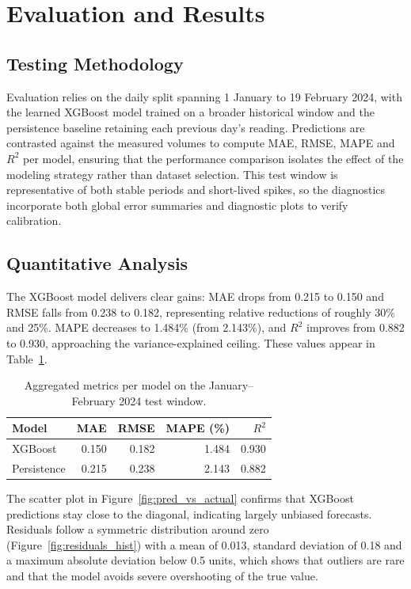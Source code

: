 \section{Evaluation and Results}
\subsection{Testing Methodology}
Evaluation relies on the daily split spanning 1 January to 19 February 2024, with the learned XGBoost model trained on a broader historical window and the persistence baseline retaining each previous day’s reading. Predictions are contrasted against the measured volumes to compute MAE, RMSE, MAPE and $R^2$ per model, ensuring that the performance comparison isolates the effect of the modeling strategy rather than dataset selection. This test window is representative of both stable periods and short-lived spikes, so the diagnostics incorporate both global error summaries and diagnostic plots to verify calibration.

\subsection{Quantitative Analysis}
The XGBoost model delivers clear gains: MAE drops from 0.215 to 0.150 and RMSE falls from 0.238 to 0.182, representing relative reductions of roughly 30\% and 25\%. MAPE decreases to 1.484\% (from 2.143\%), and $R^2$ improves from 0.882 to 0.930, approaching the variance-explained ceiling. These values appear in Table~\ref{tab:metrics}.

\begin{table}[ht]
\centering
\begin{tabular}{|l|r|r|r|r|}
\hline
\textbf{Model} & \textbf{MAE} & \textbf{RMSE} & \textbf{MAPE (\%)} & $R^{2}$ \\
\hline
XGBoost & 0.150 & 0.182 & 1.484 & 0.930 \\
\hline
Persistence & 0.215 & 0.238 & 2.143 & 0.882 \\
\hline
\end{tabular}
\caption{Aggregated metrics per model on the January–February 2024 test window.}
\label{tab:metrics}
\end{table}

The scatter plot in Figure~\ref{fig:pred_vs_actual} confirms that XGBoost predictions stay close to the diagonal, indicating largely unbiased forecasts. Residuals follow a symmetric distribution around zero (Figure~\ref{fig:residuals_hist}) with a mean of 0.013, standard deviation of 0.18 and a maximum absolute deviation below 0.5 units, which shows that outliers are rare and that the model avoids severe overshooting of the true value.

